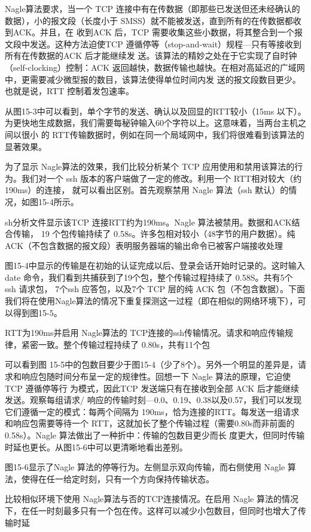 Nagle算法要求，当一个 TCP 连接中有在传数据（即那些已发送但还未经确认的数据），小的报文段（长度小于 SMSS）就不能被发送，直到所有的在传数据都收到ACK。并且，在
收到ACK 后，TCP 需要收集这些小数据，将其整合到一个报文段中发送。这种方法迫使TCP 遵循停等（stop-and-wait）规程—只有等接收到所有在传数据的ACK 后才能继续发
送。该算法的精妙之处在于它实现了自时钟（self-clocking）控制：ACK 返回越快，数据传输也越快。在相对高延迟的广域网中，更需要减少微型报的数目，该算法使得单位时间内发
送的报文段数目更少。也就是说，RTT 控制着发包速率。

从图15-3中可以看到，单个字节的发送、确认以及回显的RTT较小（15ms 以下）。为更快地生成数据，我们需要每秘钟输入60个字符以上。这意味着，当两台主机之间以很小
的 RTT传输数据时，例如在同一个局域网中，我们将很难看到该算法的显著效果。

为了显示 Nagle算法的效果，我们比较分析某个 TCP 应用使用和禁用该算法的行为。我们对一个 ssh 版本的客户端做了一定的修改。利用一个 RTT相对较大（约190ms）的连接，
就可以看出区别。首先观察禁用 Nagle 算法（ssh 默认）的情况，如图15-4所示。

sh分析文件显示该TCP 连接RTT约为190ms。Nagle 算法被禁用。数据和ACK结合传输，
19 个包传输持续了 0.58s。许多包相对较小（48字节的用户数据）。纯ACK（不包含数据的报文段）表明服务器端的输出命令已被客户端接收处理

图15-4中显示的传输是在初始的认证完成以后、登录会话开始时记录的。这时输入date 命令，我们看到共捕获到了19个包，整个传输过程持续了 0.58S。共有5个 ssh 请求包，
7个ssh 应答包，以及7个 TCP 层的纯 ACK 包（不包含数据）。下面我们将在使用Nagle算法的情况下重复探测这一过程（即在相似的网络环境下），可以得到图15-5。

RTT为190ms并启用 Nagle算法的 TCP连接的ssh传输情况。请求和响应传输规律，紧密一致。整个传输过程持续了 0.80s，共有11个包

可以看到图 15-5中的包数目要少于图15-4（少了8个）。另外一个明显的差异是，请求和响应包随时间分布呈一定的规律性。回想一下 Nagle 算法的原理，它迫使 TCP 遵循停等行
为模式，因此TCP 发送端只有在接收到全部 ACK 后才能继续发送。观察每组请求/ 响应的传输时刻—0.0、0.19、0.38以及0.57，我们可以发现它们遵循一定的模式：每两个间隔为
190ms，恰为连接的RTT。每发送一组请求和响应包需要等待一个 RTT，这就加长了整个传输过程（需要0.80s而非前面的0.58s）。Nagle 算法做出了一种折中：传输的包数目更少而长
度更大，但同时传输时延也更长。从图15-6中可以更清晰地看出差别。

图15-6显示了Nagle 算法的停等行为。左侧显示双向传输，而右侧使用 Nagle 算法，使得在任一给定时刻，只有一个方向保持传输状态。

比较相似环境下使用 Nagle算法与否的TCP连接情况。在启用 Nagle 算法的情况下，在任一时刻最多只有一个包在传。这样可以减少小包数目，但同时也增大了传输时延

